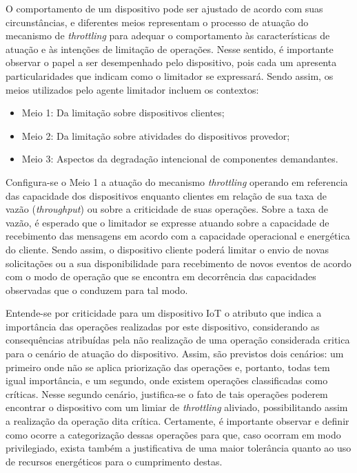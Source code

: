 O comportamento de um dispositivo pode ser ajustado de acordo com suas circunstâncias, e diferentes meios representam o processo de atuação do mecanismo de \textit{throttling} para adequar o comportamento às características de atuação e às intenções de limitação de operações. Nesse sentido, é importante observar o papel a ser desempenhado pelo dispositivo, pois cada um apresenta particularidades que indicam como o limitador se expressará. Sendo assim, os meios utilizados pelo agente limitador incluem os contextos:

\begin{itemize}
	\item Meio 1: Da limitação sobre dispositivos clientes; 
	\item Meio 2: Da limitação sobre atividades do dispositivos provedor;
	\item Meio 3: Aspectos da degradação intencional de componentes demandantes.
\end{itemize}

Configura-se o Meio 1 a atuação do mecanismo \textit{throttling} operando em referencia das capacidade dos dispositivos enquanto clientes em relação de sua taxa de vazão (\textit{throughput}) ou sobre a criticidade de suas operações. Sobre a taxa de vazão, é esperado que o limitador se expresse atuando sobre a capacidade de recebimento das mensagens em acordo com a capacidade operacional e energética do cliente. Sendo assim, o dispositivo cliente poderá limitar o envio de novas solicitações ou a sua disponibilidade para recebimento de novos eventos de acordo com o modo de operação que se encontra em decorrência das capacidades observadas que o conduzem para tal modo.

Entende-se por criticidade para um dispositivo \acs{IoT} o atributo que indica a importância das operações realizadas por este dispositivo, considerando as consequências atribuídas pela não realização de uma operação considerada critica para o cenário de atuação do dispositivo. Assim, são previstos dois cenários: um primeiro onde não se aplica priorização das operações e, portanto, todas tem igual importância, e um segundo, onde existem operações classificadas como críticas. Nesse segundo cenário, justifica-se o fato de tais operações poderem encontrar o dispositivo com um limiar de \textit{throttling} aliviado, possibilitando assim a realização da operação dita crítica. Certamente, é importante observar e definir como ocorre a categorização dessas operações para que, caso ocorram em modo privilegiado, exista também a justificativa de uma maior tolerância quanto ao uso de recursos energéticos para o cumprimento destas.


